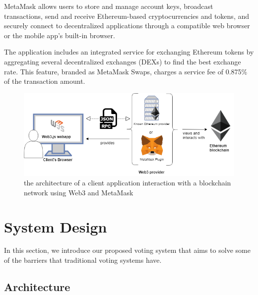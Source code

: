 MetaMask allows users to store and manage account keys, broadcast transactions, send and receive Ethereum-based cryptocurrencies and tokens, and securely connect to decentralized applications through a compatible web browser or the mobile app's built-in browser.

The application includes an integrated service for exchanging Ethereum tokens by aggregating several decentralized exchanges (DEXs) to find the best exchange rate. This feature, branded as MetaMask Swaps, charges a service fee of 0.875\% of the transaction amount\cite{stanschroederCryptoWalletMetaMask2020}.

\begin{figure}[h]
	\centering
		\includegraphics[width=12cm]{images/chapter3/web3-architecture.png}
		\caption{{\footnotesize the architecture of a client application interaction with a blockchain network using Web3 and MetaMask}}
\end{figure}

\section{System Design}

In this section, we introduce our proposed voting system that aims to solve some of the barriers that traditional voting systems have.

\subsection{Architecture}


